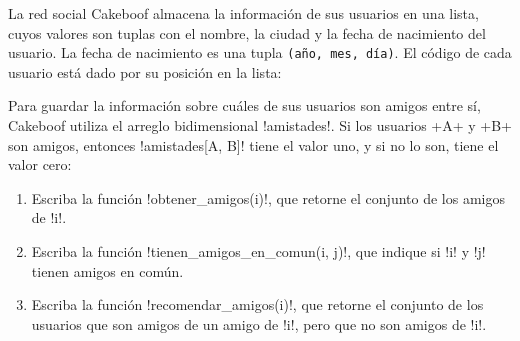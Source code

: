La red social Cakeboof almacena la información de sus usuarios en una lista,
cuyos valores son tuplas con el nombre, la ciudad y la fecha de nacimiento del usuario.
La fecha de nacimiento es una tupla \texttt{(año, mes, día)}.
El código de cada usuario está dado por su posición en la lista:


Para guardar la información sobre cuáles de sus usuarios son amigos entre sí,
Cakeboof utiliza el arreglo bidimensional \li!amistades!.
Si los usuarios \li+A+ y \li+B+ son amigos,
entonces \li!amistades[A, B]! tiene el valor uno,
y si no lo son, tiene el valor cero:


\begin{enumerate}
  \item Escriba la función \li!obtener_amigos(i)!,
    que retorne el conjunto de los amigos de \li!i!.
  \item Escriba la función \li!tienen_amigos_en_comun(i, j)!,
    que indique si \li!i! y \li!j! tienen amigos en común.
  \item Escriba la función \li!recomendar_amigos(i)!,
    que retorne el conjunto de los usuarios
    que son amigos de un amigo de \li!i!,
    pero que no son amigos de \li!i!.
\end{enumerate}


